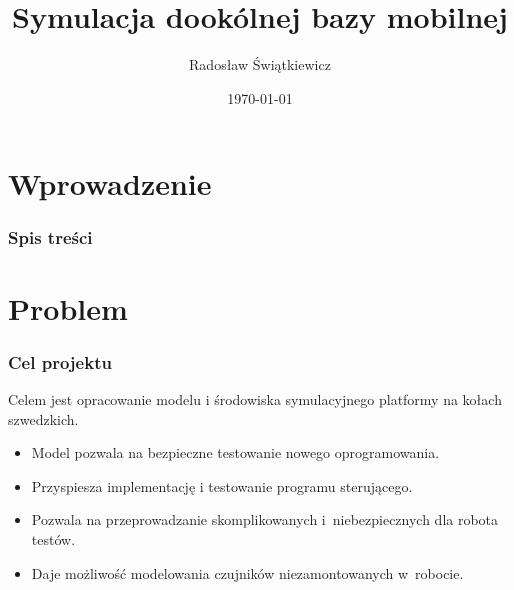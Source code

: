 \documentclass{beamer}
\begin{document}
	\section{Wprowadzenie}
	\begin{frame}
		\title[Omnivelma]{Symulacja dookólnej bazy mobilnej}
		\author{Radosław Świątkiewicz}
		\date{\today}
		\titlepage
	\end{frame}
	\begin{frame}
		\frametitle{Spis treści}
		\tableofcontents[currentsection]
	\end{frame}
	
	\section{Problem}
	\begin{frame}
		\frametitle{Cel projektu}
		Celem jest opracowanie modelu i środowiska symulacyjnego platformy na kołach szwedzkich.
		\begin{itemize}
			\item Model pozwala na bezpieczne testowanie nowego oprogramowania.
			\item Przyspiesza implementację i testowanie programu sterującego.
			\item Pozwala na przeprowadzanie skomplikowanych i~niebezpiecznych dla robota testów.
			\item Daje możliwość modelowania czujników niezamontowanych w~robocie.
		\end{itemize}
	\end{frame}
	
\end{document}
